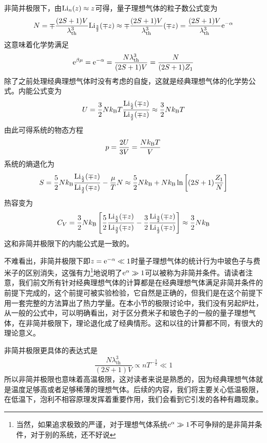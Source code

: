 \documentclass[../../main.tex]{subfiles}
\begin{document}
非简并极限下，由\(\mathrm{Li}_n(z)\approx z\)可得，量子理想气体的粒子数公式变为
\begin{equation}
    N=\mp\frac{(2S+1)V}{\lambda_{\mathrm{th}}^{3}}\mathrm{Li}_{\frac{3}{2}}(\mp z)\approx \mp\frac{(2S+1)V}{\lambda_{\mathrm{th}}^{3}}(\mp z)=\frac{(2S+1)V}{\lambda_{\mathrm{th}}^{3}}\mathrm{e}^{-\alpha}
\end{equation}
这意味着化学势满足
\begin{equation}
    \mathrm{e}^{\beta\mu}=\mathrm{e}^{-\alpha}=\frac{N\lambda_{\mathrm{th}}^{3}}{(2S+1)V}=\frac{N}{(2S+1)Z_1}
\end{equation}
除了之前处理经典理想气体时没有考虑的自旋，这就是经典理想气体的化学势公式。内能公式变为
\begin{equation}
    U=\frac{3}{2}Nk_{\mathrm{B}} T\frac{\mathrm{Li}_{\frac{5}{2}}(\mp z)}{\mathrm{Li}_{\frac{3}{2}}(\mp z)}\approx \frac{3}{2}Nk_{\mathrm{B}} T
\end{equation}
由此可得系统的物态方程
\begin{equation}
    p=\frac{2U}{3V}=\frac{Nk_{\mathrm{B}} T}{V}
\end{equation}
系统的熵退化为
\begin{equation}
    S=\frac{5}{2}Nk_{\mathrm{B}}\frac{\mathrm{Li}_{\frac{5}{2}}(\mp z)}{\mathrm{Li}_{\frac{3}{2}}(\mp z)}-\frac{\mu}{T}N\approx \frac{5}{2}Nk_{\mathrm{B}}+Nk_{\mathrm{B}}\ln\left[(2S+1)\frac{Z_1}{N}\right]
\end{equation}
热容变为
\begin{equation}
    C_V=\frac{3}{2}Nk_{\mathrm{B}}\left[\frac{5}{2}\frac{\mathrm{Li}_{\frac{5}{2}}(\mp z)}{\mathrm{Li}_{\frac{3}{2}}(\mp z)}-\frac{3}{2}\frac{\mathrm{Li}_{\frac{3}{2}}(\mp z)}{\mathrm{Li}_{\frac{1}{2}}(\mp z)}\right]\approx \frac{3}{2}Nk_{\mathrm{B}}
\end{equation}
这和非简并极限下的内能公式是一致的。

不难看出，非简并极限下即\(z=\mathrm{e}^{-\alpha}\ll 1\)时量子理想气体的统计行为中玻色子与费米子的区别消失，这强有力\footnote{当然，如果追求极致的严谨，对于理想气体系统\(\mathrm{e}^{\alpha}\gg 1\)不可争辩的是非简并条件，对于别的系统，还不好说}地说明了\(\mathrm{e}^{\alpha}\gg 1\)可以被称为非简并条件。请读者注意，我们前文所有针对经典理想气体的计算都是在经典理想气体满足非简并条件的前提下完成的，这个前提可被实验检验，它自然是正确的，但我们是在这个前提下用一套完整的方法算出了热力学量。在本小节的极限讨论中，我们没有另起炉灶，从一般的公式中，可以明确看出，对于区分费米子和玻色子的一般的量子理想气体，在非简并极限下，理论退化成了经典情形。这和以往的计算都不同，有很大的理论意义。

非简并极限更具体的表达式是
\begin{equation}
    \frac{N\lambda_{\mathrm{th}}^{3}}{(2S+1)V}\propto nT^{-\frac{3}{2}} \ll 1
\end{equation}
所以非简并极限也意味着高温极限，这对读者来说是熟悉的，因为经典理想气体就是温度足够高或者足够稀薄的理想气体。后续的内容，我们将主要关心低温极限，在低温下，泡利不相容原理发挥着重要作用，我们会看到它引发的各种有趣现象。
\end{document}
